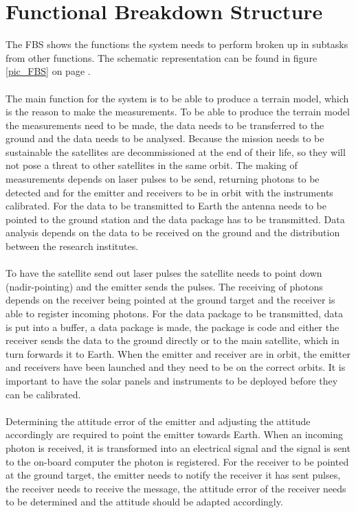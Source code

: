 \section{Functional Breakdown Structure}
\label{section_FBS}
The \ac{FBS} shows the functions the system needs to perform broken up in subtasks from other functions. The schematic representation can be found in figure \ref{pic_FBS} on page \pageref{pic_FBS}.
\\ \\
The main function for the system is to be able to produce a terrain model, which is the reason to make the measurements. To be able to produce the terrain model the measurements need to be made, the data needs to be transferred to the ground and the data needs to be analysed. Because the mission needs to be sustainable the satellites are decommissioned at the end of their life, so they will not pose a threat to other satellites in the same orbit.
The making of measurements depends on laser pulses to be send, returning photons to be detected and for the emitter and receivers to be in orbit with the instruments calibrated. For the data to be transmitted to Earth the antenna needs to be pointed to the ground station and the data package has to be transmitted. Data analysis depends on the data to be received on the ground and the distribution between the research institutes.
\\ \\
To have the satellite send out laser pulses the satellite needs to point down (nadir-pointing) and the emitter sends the pulses. The receiving of photons depends on the receiver being pointed at the ground target and the receiver is able to register incoming photons. For the data package to be transmitted, data is put into a buffer, a data package is made, the package is code and either the receiver sends the data to the ground directly or to the main satellite, which in turn forwards it to Earth. When the emitter and receiver are in orbit, the emitter and receivers have been launched and they need to be on the correct orbits. It is important to have the solar panels and instruments to be deployed before they can be calibrated.
\\ \\
Determining the attitude error of the emitter and adjusting the attitude accordingly are required to point the emitter towards Earth. When an incoming photon is received, it is transformed into an electrical signal and the signal is sent to the on-board computer the photon is registered. For the receiver to be pointed at the ground target, the emitter needs to notify the receiver it has sent pulses, the receiver needs to receive the message, the attitude error of the receiver needs to be determined and the attitude should be adapted accordingly. 

